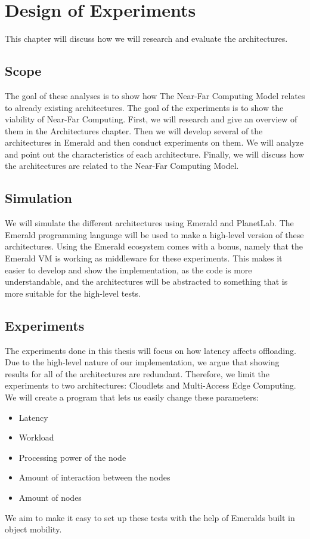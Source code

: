 \chapter{Design of Experiments}\label{chapter:design_of_experiments}

This chapter will discuss how we will research and evaluate the architectures.


\section{Scope}
The goal of these analyses is to show how The Near-Far Computing Model relates to already existing architectures. The goal of the experiments is to show the viability of Near-Far Computing. First, we will research and give an overview of them in the Architectures chapter. Then we will develop several of the architectures in Emerald and then conduct experiments on them. We will analyze and point out the characteristics of each architecture. Finally, we will discuss how the architectures are related to the Near-Far Computing Model.




\section{Simulation}
We will simulate the different architectures using Emerald and PlanetLab. The Emerald programming language will be used to make a high-level version of these architectures. Using the Emerald ecosystem comes with a bonus, namely that the Emerald VM is working as middleware for these experiments. This makes it easier to develop and show the implementation, as the code is more understandable, and the architectures will be abstracted to something that is more suitable for the high-level tests.








\section{Experiments}
The experiments done in this thesis will focus on how latency affects offloading. Due to the high-level nature of our implementation, we argue that showing results for all of the architectures are redundant. Therefore, we limit the experiments to two architectures: Cloudlets and Multi-Access Edge Computing. We will create a program that lets us easily change these parameters:
\begin{itemize}
    \item Latency
    \item Workload
    \item Processing power of the node
    \item Amount of interaction between the nodes
    \item Amount of nodes
\end{itemize}
We aim to make it easy to set up these tests with the help of Emeralds built in object mobility. 


